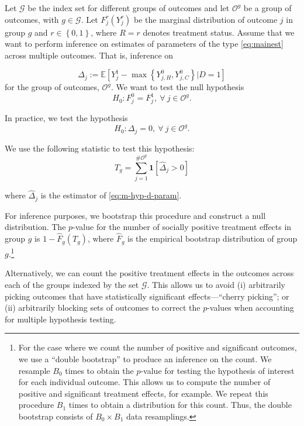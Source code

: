 Let $\mathcal{G}$ be the index set for different groups of outcomes and let $\mathcal{O}^{g}$ be a group of outcomes, with $g \in \mathcal{G}$. Let $F_{j}^r \left( Y_{j}^r \right) $ be the marginal distribution of outcome $j$ in group $g$ and $r \in \left\{ 0,1 \right\}$, where $R = r$ denotes treatment status. Assume that we want to perform inference on estimates of parameters of the type \eqref{eq:mainest} across multiple outcomes. That is, inference on

\begin{equation}
\Delta_{j} := \mathbb{E} \left[ Y_{j}^1 -  \max \left\{  Y_{j,H}^0 ,  Y_{j,C}^0 \right\} | D =1 \right] \label{eq:m-hyp-d-param}
\end{equation}
for the group of outcomes, $\mathcal{O}^{g}$. We want to test the null hypothesis
\begin{equation}
H_{0} : F_{j}^0 = F_{j}^1, \ \forall \ j \in \mathcal{O}^{g}.
\end{equation}

In practice, we test the hypothesis
\begin{equation}
H_{0} : \Delta_{j} = 0, \ \forall \ j \in \mathcal{O}^{g}.
\end{equation}

We use the following statistic to test this hypothesis:
\begin{equation}
T_{g} = \sum _{j=1}^{\# \mathcal{O}^g} \mathbf{1} \left[ \widehat{\Delta}_{j} > 0\right] \label{eq:count}
\end{equation}

\noindent where $\widehat{\Delta}_{j}$ is the estimator of \eqref{eq:m-hyp-d-param}.

For inference purposes, we bootstrap this procedure and construct a null distribution. The $p$-value for the number of socially positive treatment effects in group $g$ is $1 - \widehat{F}_{g} \left( T_{g} \right)$, where $ \widehat{F}_{g}$ is the empirical bootstrap distribution of group $g$.\footnote{For the case where we count the number of positive and significant outcomes, we use a ``double bootstrap'' to produce an inference on the count. We resample $B_{0}$ times to obtain the $p$-value for testing the hypothesis of interest for each individual outcome. This allows us to compute the number of positive and significant treatment effects, for example. We repeat this procedure $B_{1}$ times to obtain a distribution for this count. Thus, the double bootstrap consists of $B_{0} \times B_{1}$ data resamplings.}

Alternatively, we can count the positive treatment effects in the outcomes across each of the groups indexed by the set $\mathcal{G}$. This allows us to avoid (i) arbitrarily picking outcomes that have statistically significant effects---``cherry picking''; or (ii) arbitrarily blocking sets of outcomes to correct the $p$-values when accounting for multiple hypothesis testing. 


